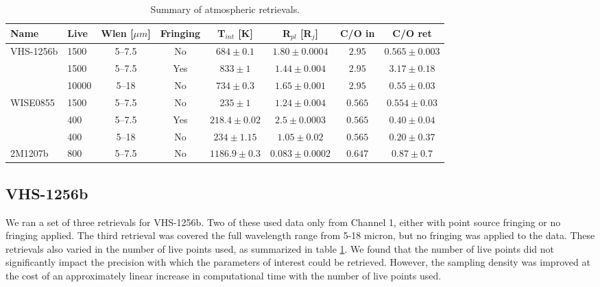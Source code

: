 \begin{table}[t]
	\begin{scriptsize}
	\begin{tabular}{l|lcccccc}
		\toprule
		\textbf{Name} & \textbf{Live} & \textbf{Wlen [$\mu m$]} & \textbf{Fringing} & \textbf{T$_{int}$ [K]} & \textbf{R$_{pl}$ [R$_{j}$]} & \textbf{C/O in} & \textbf{C/O ret}\\
		\midrule
		\multirow{3}{*}{VHS-1256b} & 1500 & 5--7.5  & No  & $684\pm0.1$ & $1.80\pm0.0004$ & $2.95$ & $0.565\pm0.003$\\
		                           & 1500 & 5--7.5 & Yes & $833\pm1$   & $1.44\pm0.004$ & $2.95$ & $3.17\pm0.18$\\
		                           & 10000 & 5--18  & No  & $734\pm0.3$ & $1.65\pm0.001$ & $2.95$ & $0.55\pm0.03$\\
		                           \midrule
		\multirow{3}{*}{WISE0855}  & 1500 & 5--7.5  & No  & $235\pm1$ & $1.24\pm0.004$ &$0.565$& $0.554\pm0.03$\\
								   & 400 & 5--7.5  & Yes & $218.4\pm0.02$ & $2.5\pm0.0003$ & $0.565$ & $0.40\pm0.04$\\
							       & 400 & 5--18   & No  & $234\pm1.15$ & $1.05\pm0.02$ & $0.565$ & $0.20\pm0.37$\\
							       \midrule
		2M1207b  & 800 & 5--7.5   & No  & $1186.9\pm0.3$ & $ 0.083\pm0.0002$ & $0.647$ & $0.87\pm0.7$\\
		\bottomrule
	\end{tabular}
	\caption{Summary of atmospheric retrievals.}
	\label{tab:atmosum}
	\end{scriptsize}
\end{table}

\subsection{VHS-1256b}
We ran a set of three retrievals for VHS-1256b.
Two of these used data only from Channel 1, either with point source fringing or no fringing applied.
The third retrieval was covered the full wavelength range from 5-18 micron, but no fringing was applied to the data.
These retrievals also varied in the number of live points used, as summarized in table \ref{tab:atmosum}.
We found that the number of live points did not significantly impact the precision with which the parameters of interest could be retrieved.
However, the sampling density was improved at the cost of an approximately linear increase in computational time with the number of live points used.

